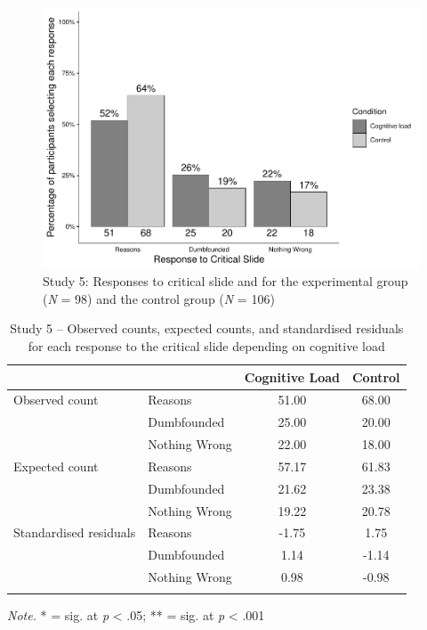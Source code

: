 \documentclass[
  american,
  man,floatsintext]{apa7}
\begin{document}
\begin{figure}
\centering
\includegraphics{cog_load_in_chunks_files/figure-latex/ch5S5fig2criticalcondition-1.pdf}
\caption{\label{fig:ch5S5fig2criticalcondition}Study 5: Responses to critical slide and for the experimental group (\emph{N} = 98) and the control group (\emph{N} = 106)}
\end{figure}

\begin{table}[tbp]

\begin{center}
\begin{threeparttable}

\caption{\label{tab:S5tab1dumb}Study 5 – Observed counts, expected counts, and standardised residuals for each response to the critical slide depending on cognitive load}

\begin{tabular}{llcc}
\toprule
 & \multicolumn{1}{c}{} & \multicolumn{1}{c}{Cognitive Load} & \multicolumn{1}{c}{Control}\\
\midrule
Observed count & Reasons & 51.00 & 68.00\\
 & Dumbfounded & 25.00 & 20.00\\
 & Nothing Wrong & 22.00 & 18.00\\
Expected count & Reasons & 57.17 & 61.83\\
 & Dumbfounded & 21.62 & 23.38\\
 & Nothing Wrong & 19.22 & 20.78\\
Standardised residuals & Reasons & -1.75 & 1.75\\
 & Dumbfounded & 1.14 & -1.14\\
 & Nothing Wrong & 0.98 & -0.98\\
\bottomrule
\addlinespace
\end{tabular}

\begin{tablenotes}[para]
\normalsize{\textit{Note.} * = sig. at \emph{p} < .05; ** = sig. at \emph{p} < .001}
\end{tablenotes}

\end{threeparttable}
\end{center}

\end{table}
\end{document}
